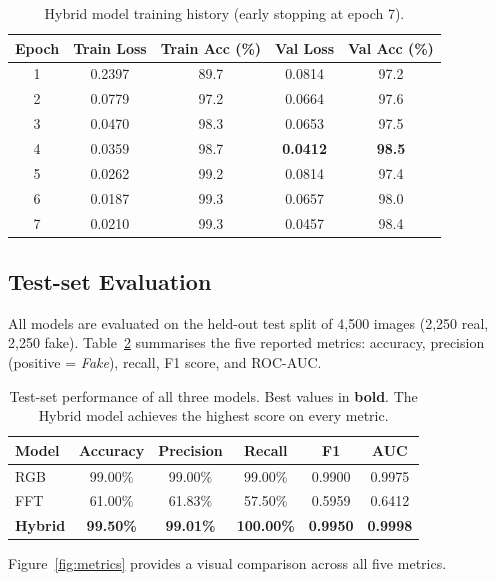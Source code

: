 \documentclass[12pt, a4paper]{article}
\begin{document}
\begin{table}[H]
\centering
\caption{Hybrid model training history (early stopping at epoch 7).}
\label{tab:hybrid_history}
\begin{tabular}{ccccc}
\toprule
\textbf{Epoch} & \textbf{Train Loss} & \textbf{Train Acc (\%)} &
\textbf{Val Loss} & \textbf{Val Acc (\%)} \\
\midrule
1 & 0.2397 & 89.7 & 0.0814 & 97.2 \\
2 & 0.0779 & 97.2 & 0.0664 & 97.6 \\
3 & 0.0470 & 98.3 & 0.0653 & 97.5 \\
4 & 0.0359 & 98.7 & \textbf{0.0412} & \textbf{98.5} \\
5 & 0.0262 & 99.2 & 0.0814 & 97.4 \\
6 & 0.0187 & 99.3 & 0.0657 & 98.0 \\
7 & 0.0210 & 99.3 & 0.0457 & 98.4 \\
\bottomrule
\end{tabular}
\end{table}

\subsection{Test-set Evaluation}

All models are evaluated on the held-out test split of 4,500 images
(2,250 real, 2,250 fake).  Table~\ref{tab:results} summarises the five
reported metrics: accuracy, precision (positive = \emph{Fake}), recall, F1
score, and ROC-AUC.

\begin{table}[H]
\centering
\caption{Test-set performance of all three models.  Best values in
\textbf{bold}.  The Hybrid model achieves the highest score on every
metric.}
\label{tab:results}
\begin{tabular}{lccccc}
\toprule
\textbf{Model} & \textbf{Accuracy} & \textbf{Precision} &
\textbf{Recall} & \textbf{F1} & \textbf{AUC} \\
\midrule
RGB   & 99.00\% & 99.00\% & 99.00\% & 0.9900 & 0.9975 \\
FFT   & 61.00\% & 61.83\% & 57.50\% & 0.5959 & 0.6412 \\
\textbf{Hybrid} &
  \textbf{99.50\%} & \textbf{99.01\%} &
  \textbf{100.00\%} & \textbf{0.9950} & \textbf{0.9998} \\
\bottomrule
\end{tabular}
\end{table}

Figure~\ref{fig:metrics} provides a visual comparison across all five metrics.
\end{document}
